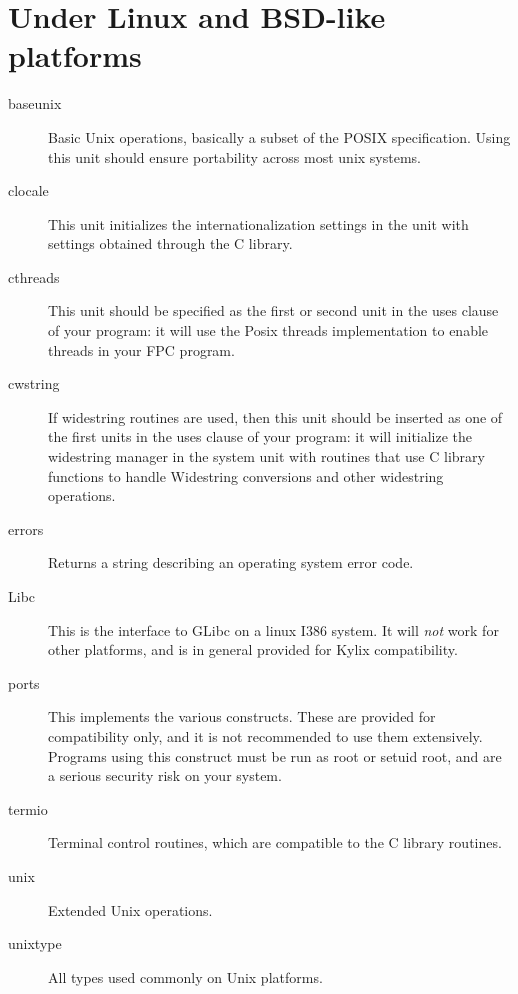 \section{Under Linux and BSD-like platforms}
\begin{description}
\item[baseunix] Basic Unix operations, basically a subset of the POSIX specification. 
Using this unit should ensure portability across most unix systems.
\item[clocale] This unit initializes the internationalization settings in
the  unit with settings obtained through the C library.
\item[cthreads] This unit should be specified as the first or second
unit in the uses clause of your program: it will use the Posix threads
implementation to enable threads in your FPC program.
\item[cwstring] If widestring routines are used, then this unit should 
be inserted as one of the first units in the uses clause of your program:
it will initialize the widestring manager in the system unit with routines
that use C library functions to handle Widestring conversions and other
widestring operations.
\item[errors] Returns a string describing an operating system error code.
\item[Libc] This is the interface to GLibc on a linux I386 system. It will
{\em not} work for other platforms, and is in general provided for Kylix
compatibility. 
\item[ports] This implements the various  constructs. These are
provided for compatibility only, and it is not recommended to use them
extensively. Programs using this construct must be run as root or setuid
root, and are a serious security risk on your system.
\item[termio] Terminal control routines, which are compatible to the C
library routines.
\item[unix] Extended Unix operations.
\item[unixtype] All types used commonly on Unix platforms.
\end{description}

